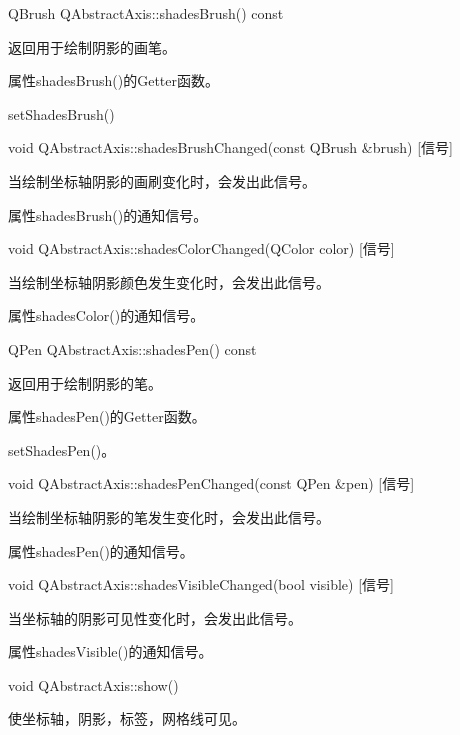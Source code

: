 QBrush QAbstractAxis::shadesBrush() const 

返回用于绘制阴影的画笔。

\begin{notice}
属性shadesBrush()的Getter函数。
\end{notice}
        
\begin{seeAlso}
setShadesBrush()
\end{seeAlso}

void QAbstractAxis::shadesBrushChanged(const QBrush \&brush) [信号] 

当绘制坐标轴阴影的画刷变化时，会发出此信号。 

\begin{notice}
属性shadesBrush()的通知信号。
\end{notice}

void QAbstractAxis::shadesColorChanged(QColor color) [信号] 

当绘制坐标轴阴影颜色发生变化时，会发出此信号。 

\begin{notice}
属性shadesColor()的通知信号。
\end{notice}

QPen QAbstractAxis::shadesPen() const 

返回用于绘制阴影的笔。

\begin{notice}
属性shadesPen()的Getter函数。
\end{notice}
    
\begin{seeAlso}
setShadesPen()。
\end{seeAlso}

void QAbstractAxis::shadesPenChanged(const QPen \&pen) [信号] 

当绘制坐标轴阴影的笔发生变化时，会发出此信号。

\begin{notice}
属性shadesPen()的通知信号。
\end{notice}

void QAbstractAxis::shadesVisibleChanged(bool visible) [信号] 

当坐标轴的阴影可见性变化时，会发出此信号。

\begin{notice}
属性shadesVisible()的通知信号。
\end{notice}


void QAbstractAxis::show() 

使坐标轴，阴影，标签，网格线可见。

